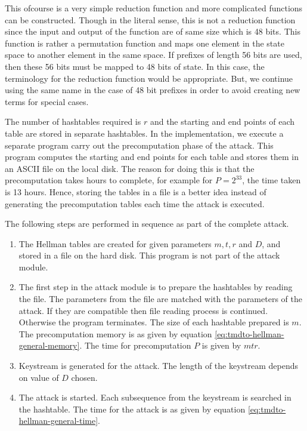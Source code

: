 This ofcourse is a very simple reduction function and more complicated functions can be constructed. Though in the literal sense, this is not a reduction function since the input and output of the function are of same size which is 48 bits. This function is rather a permutation function and maps one element in the state space to another element in the same space. If prefixes of length 56 bits are used, then these 56 bits must be mapped to 48 bits of state. In this case, the terminology for the reduction function would be appropriate. But, we continue using the same name in the case of 48 bit prefixes in order to avoid creating new terms for special cases. 

The number of hashtables required is $r$ and the starting and end points of each table are stored in separate hashtables. In the implementation, we execute a separate program carry out the precomputation phase of the attack. This program computes the starting and end points for each table and stores them in an ASCII file on the local disk. The reason for doing this is that the precomputation takes hours to complete, for example for $P = 2^33$, the time taken is 13 hours. Hence, storing the tables in a file is a better idea instead of generating the precomputation tables each time the attack is executed.

The following steps are performed in sequence as part of the complete attack. 

\begin{enumerate}
\item The Hellman tables are created for given parameters $m,t,r$ and $D$, and stored in a file on the hard disk. This program is not part of the attack module.
\item The first step in the attack module is to prepare the hashtables by reading the file. The parameters from the file are matched with the parameters of the attack. If they are compatible then file reading process is continued. Otherwise the program terminates. The size of each hashtable prepared is $m$. The precomputation memory is as given by equation \ref{eq:tmdto-hellman-general-memory}. The time for precomputation $P$ is given by $mtr$.
\item Keystream is generated for the attack. The length of the keystream depends on value of $D$ chosen.
\item The attack is started. Each subsequence from the keystream is searched in the hashtable. The time for the attack is as given by equation \ref{eq:tmdto-hellman-general-time}. 
\end{enumerate}

